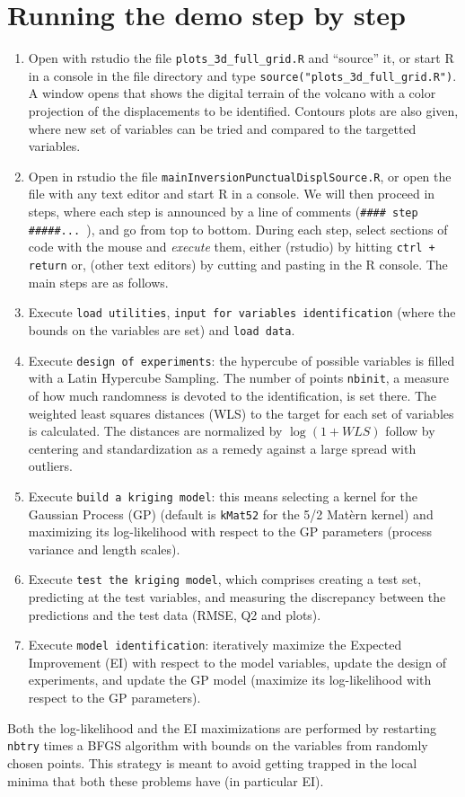 \documentclass[12pt]{article}
\begin{document}
\section{Running the demo step by step}
\begin{enumerate}
\item Open with rstudio the file \texttt{plots\_3d\_full\_grid.R} and ``source'' it, or start R in a console in the file directory and type
\texttt{source("plots\_3d\_full\_grid.R")}. A window opens that shows the digital terrain of the volcano with a color projection of the displacements to be identified. Contours plots are also given, where new set of variables can be tried and compared to the targetted variables.
\item Open in rstudio the file \texttt{mainInversionPunctualDisplSource.R}, or open the file with any text editor and start R in a console. 
We will then proceed in steps, where each step is announced by a line of comments (\verb=#### step #####... =), and go from top to bottom. 
During each step, select sections of code with the mouse and \emph{execute} them, either (rstudio) by hitting \texttt{ctrl + return} 
or, (other text editors) by cutting and pasting in the R console. The main steps are as follows.
\item Execute \texttt{load utilities}, \texttt{input for variables identification} (where the bounds on the variables are set) and \texttt{load data}.  
\item Execute \texttt{design of experiments}: the hypercube of possible variables is filled with a Latin Hypercube Sampling. The number of points 
\texttt{nbinit}, a measure of how much randomness is devoted to the identification, is set there. 
The weighted least squares distances (WLS) to the target for each set of variables is calculated. The distances are normalized by 
$\log(1+WLS)$ follow by centering and standardization as a remedy against a large spread with outliers.
\item Execute \texttt{build a kriging model}: this means selecting a kernel for the Gaussian Process (GP) (default is \texttt{kMat52} for 
the 5/2 Mat\`ern kernel) and maximizing its log-likelihood with respect to the GP parameters (process variance and length scales).
\item Execute \texttt{test the kriging model}, which comprises creating a test set, predicting at the test variables, and measuring 
the discrepancy between the predictions and the test data (RMSE, Q2 and plots).
\item Execute \texttt{model identification}: iteratively maximize the Expected Improvement (EI) with respect to the model variables, 
update the design of experiments, and update the GP model (maximize its log-likelihood with respect to the GP parameters).
\end{enumerate}
Both the log-likelihood and the EI maximizations are performed by restarting \texttt{nbtry} times 
a BFGS algorithm with bounds on the variables from randomly chosen points. This strategy is meant to avoid getting trapped in the local 
minima that both these problems have (in particular EI).
\end{document}

